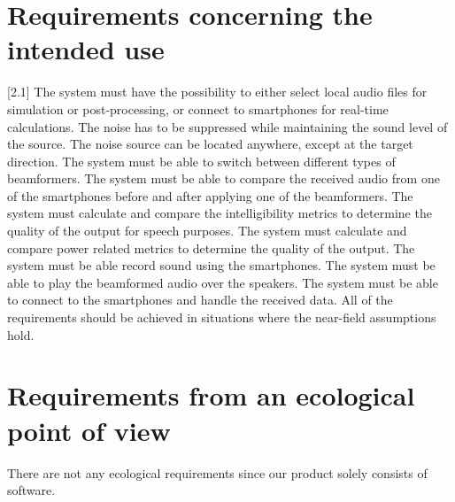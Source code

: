 \documentclass{tudelft-report}
\begin{document}
\section{Requirements concerning the intended use}
[2.1] The system must have the possibility to either select local audio files for simulation or post-processing, or connect to smartphones for real-time calculations. \newline
[2.2] The noise has to be suppressed while maintaining the sound level of the source. \newline
[2.3] The noise source can be located anywhere, except at the target direction. \newline
[2.4] The system must be able to switch between different types of beamformers. \newline
[2.5] The system must be able to compare the received audio from one of the smartphones before and after applying one of the beamformers. \newline
[2.6] The system must calculate and compare the intelligibility metrics to determine the quality of the output for speech purposes. \newline
[2.7] The system must calculate and compare power related metrics to determine the quality of the output. \newline
[2.8] The system must be able record sound using the smartphones. \newline
[2.9] The system must be able to play the beamformed audio over the speakers. \newline
[2.10] The system must be able to connect to the smartphones and handle the received data. \newline
[2.11] All of the requirements should be achieved in situations where the near-field assumptions hold.







\section{Requirements from an ecological point of view}
There are not any ecological requirements since our product solely consists of software.
\end{document}
